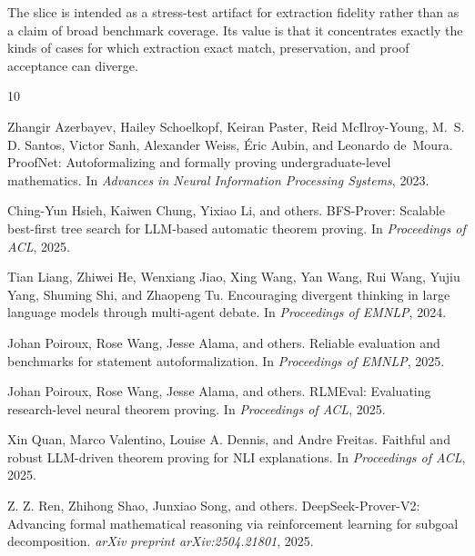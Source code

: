 \documentclass[11pt]{article}
\begin{document}
The slice is intended as a stress-test artifact for extraction fidelity rather
than as a claim of broad benchmark coverage. Its value is that it concentrates
exactly the kinds of cases for which extraction exact match, preservation, and
proof acceptance can diverge.


\begin{thebibliography}{10}

Zhangir Azerbayev, Hailey Schoelkopf, Keiran Paster, Reid
  McIlroy-Young, M.~S. D. Santos, Victor Sanh, Alexander Weiss, Éric Aubin, and
  Leonardo de~Moura.
\newblock ProofNet: Autoformalizing and formally proving undergraduate-level
  mathematics.
\newblock In \emph{Advances in Neural Information Processing Systems}, 2023.

Ching-Yun Hsieh, Kaiwen Chung, Yixiao Li, and others.
\newblock BFS-Prover: Scalable best-first tree search for LLM-based automatic
  theorem proving.
\newblock In \emph{Proceedings of ACL}, 2025.

Tian Liang, Zhiwei He, Wenxiang Jiao, Xing Wang, Yan Wang, Rui Wang, Yujiu
  Yang, Shuming Shi, and Zhaopeng Tu.
\newblock Encouraging divergent thinking in large language models through
  multi-agent debate.
\newblock In \emph{Proceedings of EMNLP}, 2024.

Johan Poiroux, Rose Wang, Jesse Alama, and others.
\newblock Reliable evaluation and benchmarks for statement autoformalization.
\newblock In \emph{Proceedings of EMNLP}, 2025.

Johan Poiroux, Rose Wang, Jesse Alama, and others.
\newblock RLMEval: Evaluating research-level neural theorem proving.
\newblock In \emph{Proceedings of ACL}, 2025.

Xin Quan, Marco Valentino, Louise A. Dennis, and Andre Freitas.
\newblock Faithful and robust LLM-driven theorem proving for NLI explanations.
\newblock In \emph{Proceedings of ACL}, 2025.

Z. Z. Ren, Zhihong Shao, Junxiao Song, and others.
\newblock DeepSeek-Prover-V2: Advancing formal mathematical reasoning via
  reinforcement learning for subgoal decomposition.
\newblock \emph{arXiv preprint arXiv:2504.21801}, 2025.


\end{thebibliography}
\end{document}
